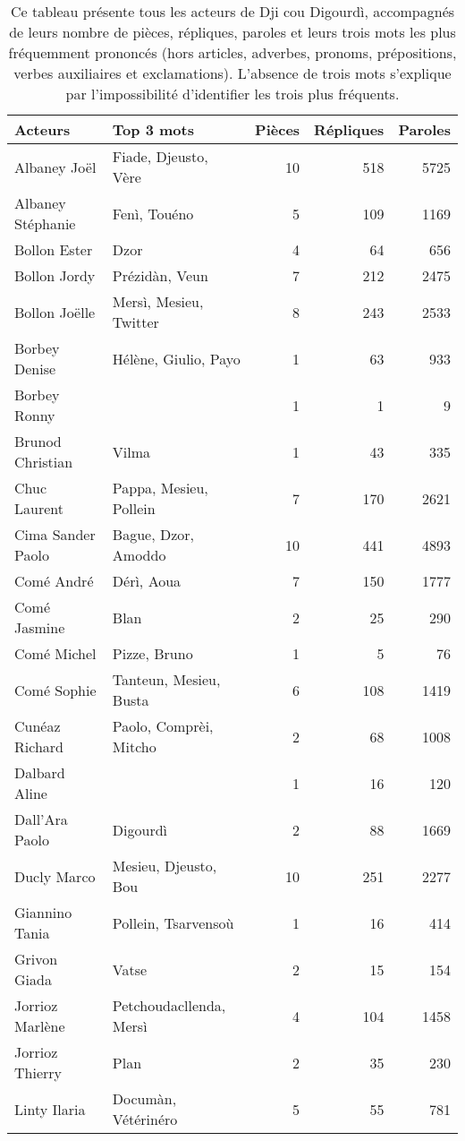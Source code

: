 \begin{longtable}{llrrr}
\caption{\scriptsize Ce tableau présente tous les acteurs de Dji cou Digourdì, accompagnés de leurs nombre de pièces, répliques, paroles et leurs trois mots les plus fréquemment prononcés (hors articles, adverbes, pronoms, prépositions, verbes auxiliaires et exclamations). L'absence de trois mots s'explique par l'impossibilité d'identifier les trois plus fréquents.}\\
\toprule
\textbf{Acteurs} & \textbf{Top 3 mots} & \textbf{Pièces} & \textbf{Répliques} & \textbf{Paroles} \\
    \midrule
Albaney Joël &Fiade, Djeusto, Vère & 10 & 518 & 5725\\
Albaney Stéphanie &Fenì, Touéno & 5 & 109 & 1169\\
Bollon Ester &Dzor & 4 & 64 & 656\\
Bollon Jordy &Prézidàn, Veun & 7 & 212 & 2475\\
Bollon Joëlle &Mersì, Mesieu, Twitter & 8 & 243 & 2533\\
Borbey Denise &Hélène, Giulio, Payo & 1 & 63 & 933\\
Borbey Ronny & & 1 & 1 & 9\\
Brunod Christian &Vilma & 1 & 43 & 335\\
Chuc Laurent &Pappa, Mesieu, Pollein & 7 & 170 & 2621\\
Cima Sander Paolo &Bague, Dzor, Amoddo & 10 & 441 & 4893\\
Comé André &Dérì, Aoua & 7 & 150 & 1777\\
Comé Jasmine &Blan & 2 & 25 & 290\\
Comé Michel &Pizze, Bruno & 1 & 5 & 76\\
Comé Sophie &Tanteun, Mesieu, Busta & 6 & 108 & 1419\\
Cunéaz Richard &Paolo, Comprèi, Mitcho & 2 & 68 & 1008\\
Dalbard Aline & & 1 & 16 & 120\\
Dall'Ara Paolo &Digourdì & 2 & 88 & 1669\\
Ducly Marco &Mesieu, Djeusto, Bou & 10 & 251 & 2277\\
Giannino Tania &Pollein, Tsarvensoù & 1 & 16 & 414\\
Grivon Giada &Vatse & 2 & 15 & 154\\
Jorrioz Marlène &Petchoudacllenda, Mersì & 4 & 104 & 1458\\
Jorrioz Thierry &Plan & 2 & 35 & 230\\
Linty Ilaria &Documàn, Vétérinéro & 5 & 55 & 781\\

\end{longtable}
